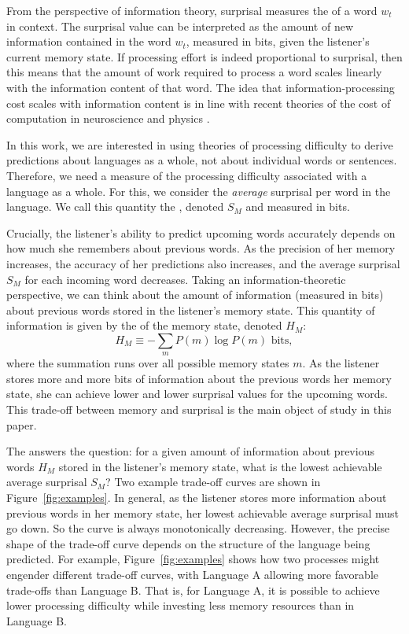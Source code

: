 From the perspective of information theory, surprisal measures the  of a word $w_t$ in context. The surprisal value can be interpreted as the amount of new information contained in the word $w_t$, measured in bits, given the listener's current memory state. If processing effort is indeed proportional to surprisal, then this means that the amount of work required to process a word scales linearly with the information content of that word. The idea that information-processing cost scales with information content is in line with recent theories of the cost of computation in neuroscience \citep{friston2010free,zenon2019information} and physics \citep{still2012thermodynamics}. 

In this work, we are interested in using theories of processing difficulty to derive predictions about languages as a whole, not about individual words or sentences. Therefore, we need a measure of the processing difficulty associated with a language as a whole. For this, we consider the \emph{average} surprisal per word in the language. We call this quantity the , denoted $S_M$ and measured in bits.

Crucially, the listener's ability to predict upcoming words accurately depends on how much she remembers about previous words. As the precision of her memory increases, the accuracy of her predictions also increases, and the average surprisal $S_M$ for each incoming word decreases. Taking an information-theoretic perspective, we can think about the amount of information (measured in bits) about previous words stored in the listener's memory state. This quantity of information is given by the  of the memory state, denoted $H_M$:
\begin{equation}
    H_M \equiv - \sum_m P(m) \log P(m) \text{ bits},
\end{equation}
where the summation runs over all possible memory states $m$. As the listener stores more and more bits of information about the previous words her memory state, she can achieve lower and lower surprisal values for the upcoming words. This trade-off between memory and surprisal is the main object of study in this paper.

The  answers the question: for a given amount of information about previous words $H_M$ stored in the listener's memory state, what is the lowest achievable average surprisal $S_M$? Two example trade-off curves are shown in Figure~\ref{fig:examples}. In general, as the listener stores more information about previous words in her memory state, her lowest achievable average surprisal must go down. So the curve is always monotonically decreasing. However, the precise shape of the trade-off curve depends on the structure of the language being predicted. For example, Figure~\ref{fig:examples} shows how two processes might engender different trade-off curves, with Language A allowing more favorable trade-offs than Language B. That is, for Language A, it is possible to achieve lower processing difficulty while investing less memory resources than in Language B.

